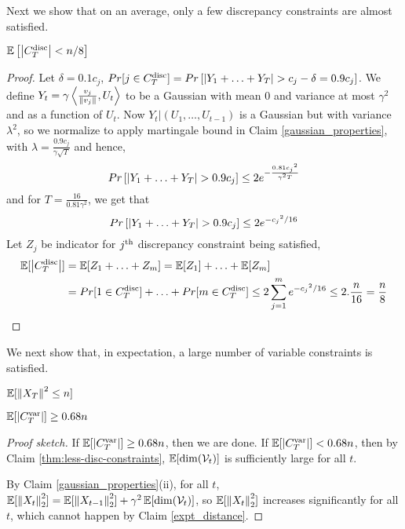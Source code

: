 Next we show that on an average, only a few discrepancy constraints are almost satisfied.
\begin{Claim}
\label{thm:less-disc-constraints}
$\mathbb{E}\left[\left\lvert C^{\mathrm{disc}}_T \right\rvert < n/8 \right]$
\end{Claim}
\begin{proof}
Let $\delta = 0.1c_j$, $Pr[j \in C^{\mathrm{disc}}_T] = Pr\left[ \left\lvert Y_1+\hdots+Y_T \right\rvert > c_j - \delta = 0.9c_j \right]$.
We define $Y_t = \gamma\left\langle \frac{v_j}{\left\lVert v_j \right\rVert},U_t\right\rangle$ to be a Gaussian with mean 0 and variance at most ${\gamma}^2$ and as a function of $U_t$.
Now $Y_t|(U_1,\hdots,U_{t-1})$ is a Gaussian but with variance ${\lambda}^2$, so we normalize to apply martingale bound in Claim \ref{gaussian_properties},  with $\lambda = \frac{0.9c_j}{\gamma \sqrt{T}}$ and hence,
\[Pr\left[ \left\lvert Y_1+\hdots+Y_T \right\rvert > 0.9c_j \right] \leq 2e^{-\frac{0.81{c_j}^2}{{\gamma}^2T}}\]
and for $T = \frac{16}{0.81{\gamma}^2}$, we get that
\[Pr\left[ \left\lvert Y_1+\hdots+Y_T \right\rvert > 0.9c_j \right] \leq 2e^{{-c_j}^2/16}\]
Let $Z_j$ be indicator for $j^{\textrm{th}}$ discrepancy constraint being satisfied,
\begin{align*}
    \mathbb{E}[\left\lvert C^{\mathrm{disc}}_T \right\rvert]
    &= \mathbb{E}[Z_1+\hdots+Z_m]
    = \mathbb{E}[Z_1] + \hdots + \mathbb{E}[Z_m]\\
    &= Pr[1 \in C^{\mathrm{disc}}_T] + \hdots + Pr[m \in C^{\mathrm{disc}}_T]
    \leq 2\sum_{j=1}^{m}{e^{{-c_j}^2/16}} \leq 2.\dfrac{n}{16} = \dfrac{n}{8}
\end{align*}
\end{proof}
We next show that, in expectation, a large number of variable constraints is satisfied.
\begin{Claim} \label{expt_distance}
$\mathbb{E}[\left\lVert X_T \right\rVert^2 \leq n]$
\end{Claim}
\begin{Claim} \label{variable_constraint_bound}
$\mathbb{E}[\left\lvert C^{\mathrm{var}}_T \right\rvert] \geq 0.68n$
\end{Claim}
\begin{proof}[Proof sketch]
If $\operatorname{\mathbb{E}}[\left\lvert C^{\mathrm{var}}_T \right\rvert] \ge 0.68n$, then we are done.
If $\operatorname{\mathbb{E}}[\left\lvert C^{\mathrm{var}}_T \right\rvert] < 0.68n$, then by Claim \ref{thm:less-disc-constraints},
$\operatorname{\mathbb{E}}[\dim(\mathcal{V}_t)]$ is sufficiently large for all $t$.

By Claim \ref{gaussian_properties}(ii), for all $t$,
$\operatorname{\mathbb{E}}[\left\lVert X_t \right\rVert_2^2] = \operatorname{\mathbb{E}}[\left\lVert X_{t-1} \right\rVert_2^2] + \gamma^2\operatorname{\mathbb{E}}[\dim(\mathcal{V}_t)]$,
so $\operatorname{\mathbb{E}}[\left\lVert X_t \right\rVert_2^2]$ increases significantly for all $t$,
which cannot happen by Claim \ref{expt_distance}.
\end{proof}

